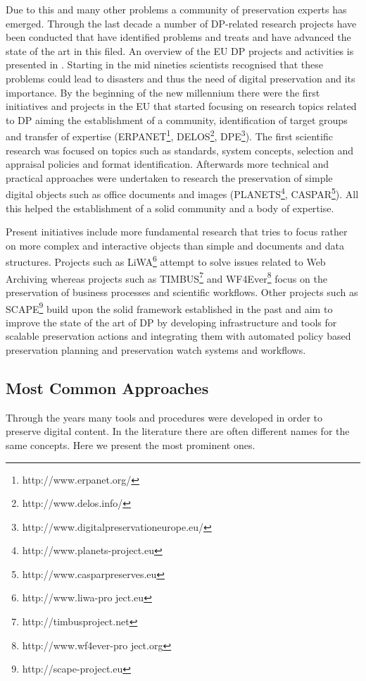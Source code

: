 Due to this and many other problems a community of preservation experts has emerged. Through the last decade a number of DP-related research projects have been conducted that have identified problems and treats and have advanced the state of the art in this filed. An overview of the EU DP projects and activities is presented in \cite{strodl:2011:dpreport}. Starting in the mid nineties scientists recognised that these problems could lead to disasters and thus the need of digital preservation and its importance. By the beginning of the new millennium there were the first initiatives and projects in the EU that started focusing on research topics related to DP aiming the establishment of a community, identification of target groups and transfer of expertise (ERPANET\footnote{http://www.erpanet.org/}, DELOS\footnote{http://www.delos.info/}, DPE\footnote{http://www.digitalpreservationeurope.eu/}). The first scientific research was focused on topics such as standards, system concepts, selection and appraisal policies and format identification. Afterwards more technical and practical approaches were undertaken to research the preservation of simple digital objects such as office documents and images (PLANETS\footnote{http://www.planets-project.eu}, CASPAR\footnote{http://www.casparpreserves.eu}). All this helped the establishment of a solid community and a body of expertise.

Present initiatives include more fundamental research that tries to focus rather on more complex and interactive objects than simple and documents and data structures. Projects such as LiWA\footnote{http://www.liwa-pro ject.eu} attempt to solve issues related to Web Archiving whereas projects such as TIMBUS\footnote{http://timbusproject.net} and WF4Ever\footnote{http://www.wf4ever-pro ject.org} focus on the preservation of business processes and scientific workflows.
Other projects such as SCAPE\footnote{http://scape-project.eu} build upon the solid framework established in the past and aim to improve the state of the art of DP by developing infrastructure and tools for scalable preservation actions and integrating them with automated policy based preservation planning and preservation watch systems and workflows.

\subsection{Most Common Approaches}
Through the years many tools and procedures were developed in order to preserve digital content. In the literature there are often different names for the same concepts. Here we present the most prominent ones. \newline

